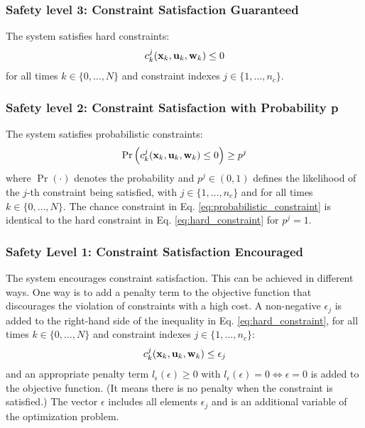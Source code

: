 \documentclass{article}
\begin{document}
\subsubsection{Safety level 3: Constraint Satisfaction Guaranteed}
The system satisfies hard constraints:
\begin{equation} \label{eq:hard_constraint}
    c^j_k(\mathbf{x}_k, \mathbf{u}_k, \mathbf{w}_k) \leq 0
\end{equation}
for all times $k \in \{0, \ldots, N\}$ and constraint indexes $j \in \{1, \ldots, n_c\}$.

\subsubsection{Safety level 2: Constraint Satisfaction with Probability p}
The system satisfies probabilistic constraints:
\begin{equation} \label{eq:probabilistic_constraint}
    \Pr \left( c^j_k (\mathbf{x}_k, \mathbf{u}_k, \mathbf{w}_k) \leq 0 \right) \geq p^j
\end{equation}
where $\Pr(\cdot)$ denotes the probability and $p^j \in (0, 1)$ defines the likelihood of the $j$-th constraint being satisfied, with $j \in \{1, \ldots, n_c\}$ and for all times $k \in \{0, \ldots, N\}$.
The chance constraint in Eq. \eqref{eq:probabilistic_constraint} is identical to the hard constraint in Eq. \eqref{eq:hard_constraint} for $p^j = 1$.

\subsubsection{Safety Level 1: Constraint Satisfaction Encouraged}

The system encourages constraint satisfaction.
This can be achieved in different ways.
One way is to add a penalty term to the objective function that discourages the violation of constraints with a high cost.
A non-negative $\epsilon_j$ is added to the right-hand side of the inequality in Eq. \eqref{eq:hard_constraint}, for all times $k \in \{0, \ldots, N\}$ and constraint indexes $j \in \{1, \ldots, n_c\}$:
\begin{equation} \label{eq:soft_constraint}
    c^j_k(\mathbf{x}_k, \mathbf{u}_k, \mathbf{w}_k) \leq \epsilon_j
\end{equation}
and an appropriate penalty term $l_\epsilon(\epsilon) \geq 0$ with $l_\epsilon(\epsilon) = 0 \Longleftrightarrow \epsilon = 0$ is added to the objective function. (It means there is no penalty when the constraint is satisfied.)
The vector $\epsilon$ includes all elements $\epsilon_j$ and is an additional variable of the optimization problem.
\end{document}
